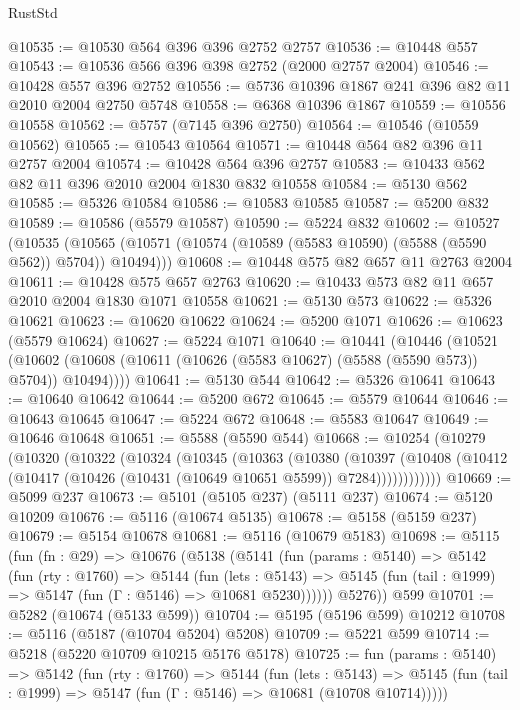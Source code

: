\begin{lexlean}{RustStd}
\begin{coremodule}
@10535 := @10530 @564 @396 @396 @2752 @2757
@10536 := @10448 @557
@10543 := @10536 @566 @396 @398 @2752 (@2000 @2757 @2004)
@10546 := @10428 @557 @396 @2752
@10556 := @5736 @10396 @1867 @241 @396 @82 @11 @2010 @2004 @2750 @5748
@10558 := @6368 @10396 @1867
@10559 := @10556 @10558
@10562 := @5757 (@7145 @396 @2750)
@10564 := @10546 (@10559 @10562)
@10565 := @10543 @10564
@10571 := @10448 @564 @82 @396 @11 @2757 @2004
@10574 := @10428 @564 @396 @2757
@10583 := @10433 @562 @82 @11 @396 @2010 @2004 @1830 @832 @10558
@10584 := @5130 @562
@10585 := @5326 @10584
@10586 := @10583 @10585
@10587 := @5200 @832
@10589 := @10586 (@5579 @10587)
@10590 := @5224 @832
@10602 := @10527
    (@10535 (@10565 (@10571 (@10574 (@10589 (@5583 @10590) (@5588 (@5590 @562)) @5704)) @10494)))
@10608 := @10448 @575 @82 @657 @11 @2763 @2004
@10611 := @10428 @575 @657 @2763
@10620 := @10433 @573 @82 @11 @657 @2010 @2004 @1830 @1071 @10558
@10621 := @5130 @573
@10622 := @5326 @10621
@10623 := @10620 @10622
@10624 := @5200 @1071
@10626 := @10623 (@5579 @10624)
@10627 := @5224 @1071
@10640 := @10441
    (@10446
      (@10521 (@10602 (@10608 (@10611 (@10626 (@5583 @10627) (@5588 (@5590 @573)) @5704)) @10494))))
@10641 := @5130 @544
@10642 := @5326 @10641
@10643 := @10640 @10642
@10644 := @5200 @672
@10645 := @5579 @10644
@10646 := @10643 @10645
@10647 := @5224 @672
@10648 := @5583 @10647
@10649 := @10646 @10648
@10651 := @5588 (@5590 @544)
@10668 := @10254
    (@10279
      (@10320
        (@10322
          (@10324
            (@10345
              (@10363
                (@10380
                  (@10397
                    (@10408 (@10412 (@10417 (@10426 (@10431 (@10649 @10651 @5599)) @7284))))))))))))
@10669 := @5099 @237
@10673 := @5101 (@5105 @237) (@5111 @237)
@10674 := @5120 @10209
@10676 := @5116 (@10674 @5135)
@10678 := @5158 (@5159 @237)
@10679 := @5154 @10678
@10681 := @5116 (@10679 @5183)
@10698 := @5115
    (fun (fn : @29) =>
    @10676
      (@5138
        (@5141
          (fun (params : @5140) =>
          @5142
            (fun (rty : @1760) =>
            @5144
              (fun (lets : @5143) =>
              @5145 (fun (tail : @1999) => @5147 (fun (Γ : @5146) => @10681 @5230))))))
        @5276))
    @599
@10701 := @5282 (@10674 (@5133 @599))
@10704 := @5195 (@5196 @599) @10212
@10708 := @5116 (@5187 (@10704 @5204) @5208)
@10709 := @5221 @599
@10714 := @5218 (@5220 @10709 @10215 @5176 @5178)
@10725 := fun (params : @5140) =>
  @5142
    (fun (rty : @1760) =>
    @5144
      (fun (lets : @5143) =>
      @5145 (fun (tail : @1999) => @5147 (fun (Γ : @5146) => @10681 (@10708 @10714)))))

\end{coremodule}
\end{lexlean}
